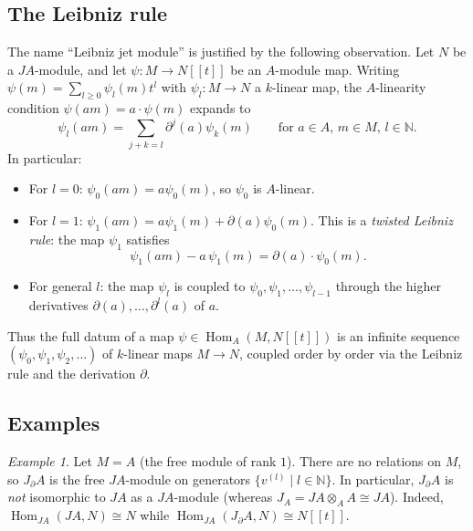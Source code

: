 \documentclass[a4paper, 12pt]{amsart}
\theoremstyle{definition}
\theoremstyle{remark}
\newtheorem{example}[theorem]{Example}
\begin{document}
\subsection{The Leibniz rule}
\label{sec:leibniz-rule}

The name ``Leibniz jet module'' is justified by the following observation.
Let $N$ be a $JA$-module,
and let $\psi: M \to N[[t]]$ be an $A$-module map.
Writing $\psi(m) = \sum_{l \ge 0} \psi_l(m) t^l$ with $\psi_l: M \to N$ a $k$-linear map,
the $A$-linearity condition $\psi(am) = a \cdot \psi(m)$ expands to
\begin{equation}
  \label{eq:leibniz-expansion}
  \psi_l(am) = \sum_{j + k = l} \partial^j(a) \psi_k(m) \qquad \text{for $a \in A$, $m \in M$, $l \in \mathbb{N}$}.
\end{equation}
In particular:
\begin{itemize}
\item
  For $l = 0$: $\psi_0(am) = a \psi_0(m)$, so $\psi_0$ is $A$-linear.
\item
  For $l = 1$: $\psi_1(am) = a\psi_1(m) + \partial(a)\psi_0(m)$.
  This is a \emph{twisted Leibniz rule}:
  the map $\psi_1$ satisfies
  \begin{equation*}
    \psi_1(am) - a\,\psi_1(m) = \partial(a) \cdot \psi_0(m).
  \end{equation*}
\item
  For general $l$:
  the map $\psi_l$ is coupled to $\psi_0, \psi_1, \dots, \psi_{l-1}$
  through the higher derivatives $\partial(a), \dots, \partial^l(a)$ of $a$.
\end{itemize}
Thus the full datum of a map $\psi \in \operatorname{Hom}_A(M, N[[t]])$
is an infinite sequence $(\psi_0, \psi_1, \psi_2, \dots)$ of $k$-linear maps $M \to N$,
coupled order by order via the Leibniz rule and the derivation $\partial$.

\subsection{Examples}
\label{sec:examples-JdM}

\begin{example}
  \label{exa:JdM-free}
  Let $M = A$ (the free module of rank $1$).
  There are no relations on $M$,
  so $J_\partial A$ is the free $JA$-module on generators $\{v^{(l)} \mid l \in \mathbb{N}\}$.
  In particular, $J_\partial A$ is \emph{not} isomorphic to $JA$ as a $JA$-module
  (whereas $J_A = JA \otimes_A A \cong JA$).
  Indeed, $\operatorname{Hom}_{JA}(JA, N) \cong N$ while $\operatorname{Hom}_{JA}(J_\partial A, N) \cong N[[t]]$.
\end{example}
\end{document}
